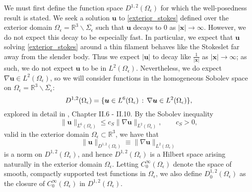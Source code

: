 \documentclass[11pt]{article}
\numberwithin{equation}{section}
\newcommand{\R}{\mathbb{R}}
\newcommand{\bu}{\bm{u}}
\newcommand{\bx}{\bm{x}}
\newcommand{\ts}{\thinspace}
\theoremstyle{definition}
\begin{document}
We must first define the function space $D^{1,2}(\Omega_{\epsilon})$ for which the well-posedness result is stated. We seek a solution $\bu$ to \eqref{exterior_stokes} defined over the exterior domain $\Omega_{\epsilon}=\R^3\backslash{\overline{\Sigma_{\epsilon}}}$ such that $\bu$ decays to 0 as $|\bx|\to \infty$. However, we do not expect this decay to be especially fast. In particular, we expect that $\bu$ solving \eqref{exterior_stokes} around a thin filament behaves like the Stokeslet far away from the slender body. Thus we expect $|\bu|$ to decay like $\frac{1}{|\bx|}$ as $|\bx| \to \infty$; as such, we do not expect $\bu$ to be in $L^2(\Omega_{\epsilon})$. Nevertheless, we do expect $\nabla \bu\in L^2(\Omega_{\epsilon})$, so we will consider functions in the homogeneous Sobolev space on $\Omega_{\epsilon} = \R^3\backslash \overline{\Sigma_{\epsilon}}$:
\begin{equation}\label{D12_definition}
 D^{1,2}(\Omega_{\epsilon}) = \{ \bu\in L^6(\Omega_{\epsilon}) \ts : \ts \nabla \bu\in L^2(\Omega_{\epsilon}) \}, 
 \end{equation}
 explored in detail in \cite{galdi2011introduction}, Chapter II.6 - II.10. By the Sobolev inequality 
\begin{equation}\label{sobolev_ineq}
\|\bu\|_{L^6(\Omega_{\epsilon})} \le c_S\|\nabla \bu\|_{L^2(\Omega_{\epsilon})}, \qquad c_S>0,
\end{equation}
valid in the exterior domain $\Omega_{\epsilon}\subset \R^3$, we have that
\begin{equation}\label{D12_norm}
\|\bu\|_{D^{1,2}(\Omega_{\epsilon})} \equiv \|\nabla \bu \|_{L^2(\Omega_{\epsilon})}
\end{equation}
is a norm on $D^{1,2}(\Omega_{\epsilon})$, and hence $D^{1,2}(\Omega_{\epsilon})$ is a Hilbert space arising naturally in the exterior domain $\Omega_{\epsilon}$. Letting $C_0^{\infty}(\Omega_{\epsilon})$ denote the space of smooth, compactly supported test functions in $\Omega_\epsilon$, we also define $D^{1,2}_0(\Omega_{\epsilon})$ as the closure of $C_0^{\infty}(\Omega_{\epsilon})$ in $D^{1,2}(\Omega_{\epsilon})$. \\
%
\end{document}
